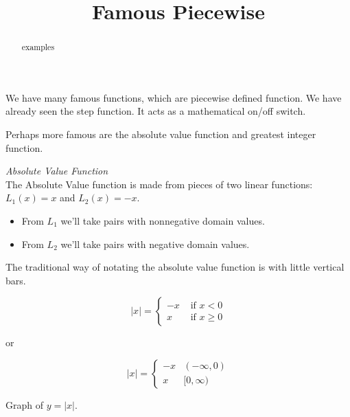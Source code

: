\documentclass{ximera}
\title{Famous Piecewise}
\begin{document}
\begin{abstract}
examples
\end{abstract}
\maketitle



We have many famous functions, which are piecewise defined function.  We have already seen the step function.  It acts as a mathematical on/off switch.

Perhaps more famous are the absolute value function and greatest integer function.







\begin{example} \textit{Absolute Value Function} \\

The Absolute Value function is made from pieces of two linear functions: $L_1(x) = x$ and $L_2(x) = -x$. 

\begin{itemize}
\item From $L_1$ we'll take pairs with nonnegative domain values.
\item From $L_2$ we'll take pairs with negative domain values.
\end{itemize}

The traditional way of notating the absolute value function is with little vertical bars.


\[
|x| = 
\begin{cases}
  -x & \text{ if }  x < 0 \\
  x & \text{ if } x \geq 0
\end{cases}
\]


or

\[
|x| = 
\begin{cases}
  -x & (-\infty, 0) \\
  x & [0, \infty)
\end{cases}
\]


Graph of $y = |x|$.
\begin{image}
\end{image}


\end{example}
\end{document}
